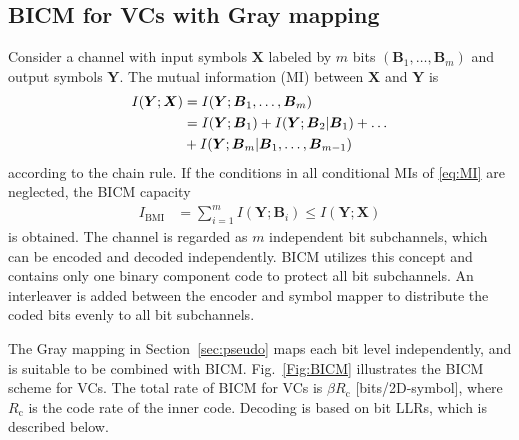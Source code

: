 \documentclass[journal]{IEEEtran}
\newcommand{\bb}{\boldsymbol{b}}
\newcommand{\bh}{\boldsymbol{h}}
\newcommand{\bu}{\boldsymbol{u}}
\newcommand{\bv}{\boldsymbol{v}}
\newcommand{\bx}{\boldsymbol{x}}
\newcommand{\bB}{\boldsymbol{B}}
\newcommand{\bX}{\boldsymbol{X}}
\newcommand{\bY}{\boldsymbol{Y}}
\newcommand{\Rc}{R_\mathrm{c}}
\begin{document}

\subsection{BICM for VCs with Gray mapping}
Consider a channel with input symbols $\bX$ labeled by $m$ bits $(\bB_1,\dots,\bB_m)$ and output symbols $\bY$. The mutual information (MI) between $\bX$ and $\bY$ is
\begin{align}\label{eq:MI}
    I(\bY;\bX)&=I(\bY;\bB_1,\dots,\bB_m) \notag\\ &=I(\bY;\bB_1)+I(\bY;\bB_2|\bB_1)+\dots \notag\\
    &+I(\bY;\bB_m|\bB_1,\dots,\bB_{m-1}) 
\end{align}
according to the chain rule. If the conditions in all conditional MIs of \eqref{eq:MI} are neglected, the BICM capacity \cite{agrell11}
\begin{align}
     I_{\text{BMI}}&=\sum_{i=1}^{m}I(\bY;\bB_i)\leq I(\bY;\bX)\label{eq:GMI}
\end{align}
is obtained. The channel is regarded as $m$ independent bit subchannels, which can be encoded and decoded independently. BICM utilizes this concept and contains only one binary component code to protect all bit subchannels. An interleaver is added between the encoder and symbol mapper to distribute the coded bits evenly to all bit subchannels.

The Gray mapping in Section~\ref{sec:pseudo} maps each bit level independently, and is suitable to be combined with BICM. Fig.~\ref{Fig:BICM} illustrates the BICM scheme for VCs. 
The total rate of BICM for VCs is $\beta \Rc$ [bits/2D-symbol], where $\Rc$ is the code rate of the inner code. Decoding is based on bit LLRs, which is described below.
\end{document}
